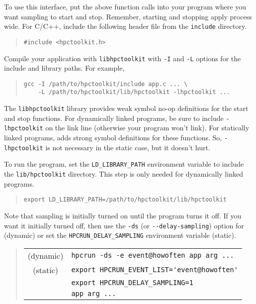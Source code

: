 To use this interface, put the above function calls into your program
where you want sampling to start and stop.  Remember, starting and
stopping apply process wide.  For C/C++, include the following header
file from the \HPCToolkit{} \verb|include| directory.

\begin{quote}
\begin{verbatim}
#include <hpctoolkit.h>
\end{verbatim}
\end{quote}

Compile your application with \verb|libhpctoolkit| with \verb|-I| and
\verb|-L| options for the include and library paths.  For example,

\begin{quote}
\begin{verbatim}
gcc -I /path/to/hpctoolkit/include app.c ... \
    -L /path/to/hpctoolkit/lib/hpctoolkit -lhpctoolkit ...
\end{verbatim}
\end{quote}

The \verb|libhpctoolkit| library provides weak symbol no-op definitions
for the start and stop functions.  For dynamically linked programs, be
sure to include \verb|-lhpctoolkit| on the link line (otherwise your
program won't link).  For statically linked programs, \hpclink{} adds
strong symbol definitions for these functions.  So, \verb|-lhpctoolkit|
is not necessary in the static case, but it doesn't hurt.

To run the program, set the \verb|LD_LIBRARY_PATH| environment
variable to include the \HPCToolkit{} \verb|lib/hpctoolkit| directory.
This step is only needed for dynamically linked programs.

\begin{quote}
\begin{verbatim}
export LD_LIBRARY_PATH=/path/to/hpctoolkit/lib/hpctoolkit
\end{verbatim}
\end{quote}

Note that sampling is initially turned on until the program turns it
off.  If you want it initially turned off, then use the \verb|-ds| (or
\verb|--delay-sampling|) option for \hpcrun{} (dynamic) or set the
\verb|HPCRUN_DELAY_SAMPLING| environment variable (static).

\begin{quote}
\begin{tabular}{@{}cl}
(dynamic) & \verb|hpcrun -ds -e event@howoften app arg ...|  \\
(static)  & \verb|export HPCRUN_EVENT_LIST='event@howoften'| \\
& \verb|export HPCRUN_DELAY_SAMPLING=1| \\
& \verb|app arg ...|
\end{tabular}
\end{quote}

